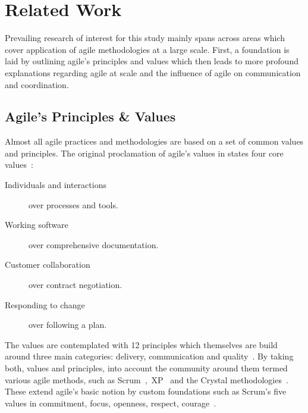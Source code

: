 \chapter{Related Work}
\label{chap:related-work}

Prevailing research of interest for this study mainly spans across areas which cover application of agile methodologies at a large scale. First, a foundation is laid by outlining agile's principles and values which then leads to more profound explanations regarding agile at scale and the influence of agile on communication and coordination.

\section{Agile's Principles \& Values}

Almost all agile practices and methodologies are based on a set of common values and principles. The original proclamation of agile's values in  states four core values~\citep{beck2001agile}:

\begin{description}
  \item[Individuals and interactions] over processes and tools.
  \item[Working software] over comprehensive documentation.
  \item[Customer collaboration] over contract negotiation.
  \item[Responding to change] over following a plan.
\end{description}

The values are contemplated with 12 principles which themselves are build around three main categories: delivery, communication and quality~\citep{beck2001agile}. By taking both, values and principles, into account the community around them termed various agile methods, such as Scrum~\citep{sims2012scrum},~\ac{XP}~\citep{beck2004xp} and the Crystal methodologies~\citep{cockburn2004crystal}. These extend agile's basic notion by custom foundations such as Scrum's five values in commitment, focus, openness, respect, courage~\cite{schwaberagilescrum}.

